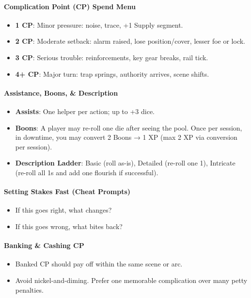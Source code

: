 \documentclass[11pt]{article}
\begin{document}
\paragraph{Complication Point (CP) Spend Menu}
\begin{itemize}
    \item \textbf{1 CP}: Minor pressure: noise, trace, +1 Supply segment.
    \item \textbf{2 CP}: Moderate setback: alarm raised, lose position/cover, lesser foe or lock.
    \item \textbf{3 CP}: Serious trouble: reinforcements, key gear breaks, rail tick.
    \item \textbf{4+ CP}: Major turn: trap springs, authority arrives, scene shifts.
\end{itemize}

\paragraph{Assistance, Boons, \& Description}
\begin{itemize}
    \item \textbf{Assists}: One helper per action; up to +3 dice.
    \item \textbf{Boons}: A player may re-roll one die after seeing the pool. Once per session, in downtime, you may convert 2 Boons → 1 XP (max 2 XP via conversion per session).
    \item \textbf{Description Ladder}: Basic (roll as-is), Detailed (re-roll one 1), Intricate (re-roll all 1s and add one flourish if successful).
\end{itemize}

\paragraph{Setting Stakes Fast (Cheat Prompts)}
\begin{itemize}
    \item If this goes right, what changes?
    \item If this goes wrong, what bites back?
\end{itemize}

\paragraph{Banking \& Cashing CP}
\begin{itemize}
    \item Banked CP should pay off within the same scene or arc.
    \item Avoid nickel-and-diming. Prefer one memorable complication over many petty penalties.
\end{itemize}
\end{document}
